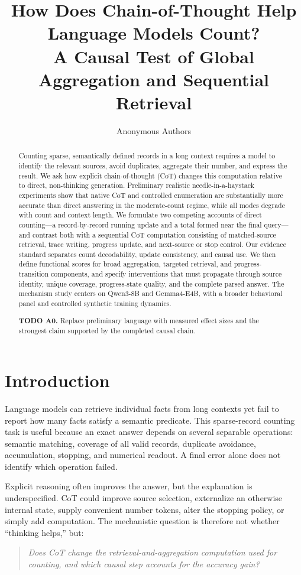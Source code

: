 \documentclass[10pt,twocolumn]{article}
\title{\vspace{-1.2em}\textbf{How Does Chain-of-Thought Help Language Models Count?}\\
A Causal Test of Global Aggregation and Sequential Retrieval}
\author{Anonymous Authors}
\date{}
\newcommand{\todoid}[2]{%
  \par\noindent\textcolor{red!75!black}{\textbf{TODO #1.} #2}\par}
\begin{document}
\maketitle
\vspace{-1.2em}

\begin{abstract}
Counting sparse, semantically defined records in a long context requires a model to identify
the relevant sources, avoid duplicates, aggregate their number, and express the result.
We ask how explicit chain-of-thought (CoT) changes this computation relative to direct,
non-thinking generation. Preliminary realistic needle-in-a-haystack experiments show that
native CoT and controlled enumeration are substantially more accurate than direct answering in
the moderate-count regime, while all modes degrade with count and context length. We formulate
two competing accounts of direct counting---a record-by-record running update and a total formed
near the final query---and contrast both with a sequential CoT computation consisting of
matched-source retrieval, trace writing, progress update, and next-source or stop control.
Our evidence standard separates count decodability, update consistency, and causal use.
We then define functional scores for broad aggregation, targeted retrieval, and
progress-transition components, and specify interventions that must propagate through source
identity, unique coverage, progress-state quality, and the complete parsed answer.
The mechanism study centers on Qwen3-8B and Gemma4-E4B, with a broader behavioral panel and
controlled synthetic training dynamics.
\todoid{A0}{Replace preliminary language with measured effect sizes and the strongest claim
supported by the completed causal chain.}
\end{abstract}

\section{Introduction}
Language models can retrieve individual facts from long contexts yet fail to report how many
facts satisfy a semantic predicate. This sparse-record counting task is useful because an exact
answer depends on several separable operations: semantic matching, coverage of all valid
records, duplicate avoidance, accumulation, stopping, and numerical readout. A final error alone
does not identify which operation failed.

Explicit reasoning often improves the answer, but the explanation is underspecified.
CoT could improve source selection, externalize an otherwise internal state, supply convenient
number tokens, alter the stopping policy, or simply add computation. The mechanistic question is
therefore not whether ``thinking helps,'' but:
\begin{quote}
\emph{Does CoT change the retrieval-and-aggregation computation used for counting, and which
causal step accounts for the accuracy gain?}
\end{quote}
\end{document}
